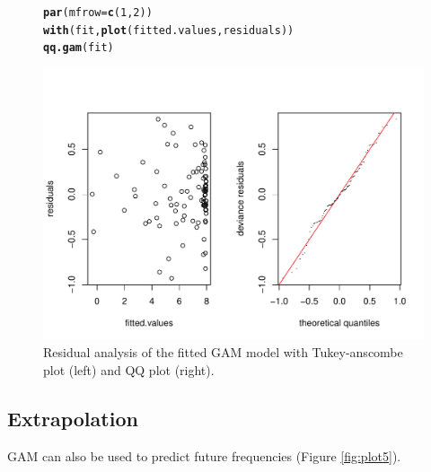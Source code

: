 \documentclass{article}\usepackage[]{graphicx}\usepackage[]{color}
\makeatletter
\newcommand{\hlnum}[1]{\textcolor[rgb]{0.686,0.059,0.569}{#1}}%
\newcommand{\hlstd}[1]{\textcolor[rgb]{0.345,0.345,0.345}{#1}}%
\newcommand{\hlkwc}[1]{\textcolor[rgb]{0.333,0.667,0.333}{#1}}%
\newcommand{\hlkwd}[1]{\textcolor[rgb]{0.737,0.353,0.396}{\textbf{#1}}}%
\newenvironment{kframe}{%
 \def\at@end@of@kframe{}%
 \ifinner\ifhmode%
  \def\at@end@of@kframe{\end{minipage}}%
  \begin{minipage}{\columnwidth}%
 \fi\fi%
 \def\FrameCommand##1{\hskip\@totalleftmargin \hskip-\fboxsep
 \colorbox{shadecolor}{##1}\hskip-\fboxsep
     \hskip-\linewidth \hskip-\@totalleftmargin \hskip\columnwidth}%
 \MakeFramed {\advance\hsize-\width
   \@totalleftmargin\z@ \linewidth\hsize
   \@setminipage}}%
 {\par\unskip\endMakeFramed%
 \at@end@of@kframe}
\newenvironment{knitrout}{}{} %
\makeatother
\begin{document}
\begin{figure}
\begin{knitrout}
\color{fgcolor}\begin{kframe}
\begin{alltt}
\hlkwd{par}\hlstd{(}\hlkwc{mfrow} \hlstd{=} \hlkwd{c}\hlstd{(}\hlnum{1}\hlstd{,} \hlnum{2}\hlstd{))}
\hlkwd{with}\hlstd{(fit,} \hlkwd{plot}\hlstd{(fitted.values, residuals))}
\hlkwd{qq.gam}\hlstd{(fit)}
\end{alltt}
\end{kframe}

\includegraphics[width=1\linewidth]{figure/plot4-1} \hfill{}



\end{knitrout}
\caption{Residual analysis of the fitted GAM model with Tukey-anscombe plot (left) and QQ plot (right).}
\label{fig:plot4}
\end{figure}



\subsection{Extrapolation}

GAM can also be used to predict future frequencies (Figure \ref{fig:plot5}).
\end{document}
